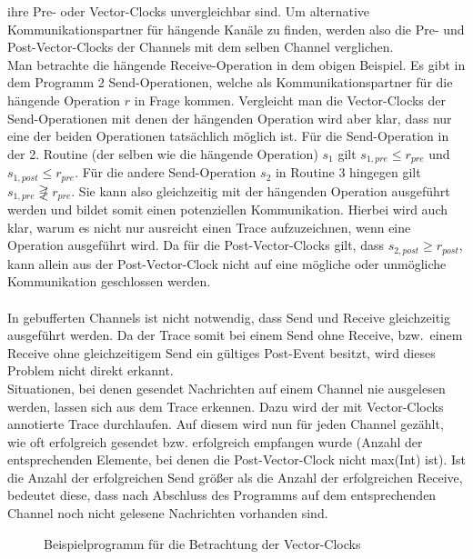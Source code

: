  ihre Pre- oder Vector-Clocks unvergleichbar sind.
Um alternative Kommunikationspartner für hängende Kanäle zu finden, werden also
die Pre- und Post-Vector-Clocks der Channels mit dem selben Channel verglichen.\\
Man betrachte die hängende Receive-Operation in dem obigen Beispiel. Es gibt 
in dem Programm 2 Send-Operationen, welche als Kommunikationspartner für 
die hängende Operation $r$ in Frage kommen. Vergleicht man die Vector-Clocks der 
Send-Operationen mit denen der hängenden Operation wird aber klar, dass nur 
eine der beiden Operationen tatsächlich möglich ist. Für die Send-Operation 
in der 2. Routine (der selben wie die hängende Operation) $s_1$ gilt 
$s_{1, pre} \leq r_{pre}$ und $s_{1, post} \leq r_{pre}$.  
Für die andere Send-Operation $s_2$ in Routine 3 hingegen gilt 
$s_{1, pre} \not\gtreqless r_{pre}$. Sie kann also gleichzeitig mit der 
hängenden Operation ausgeführt werden und bildet somit einen potenziellen 
Kommunikation. Hierbei wird auch klar, warum es nicht nur ausreicht einen 
Trace aufzuzeichnen, wenn eine Operation ausgeführt wird. Da für die 
Post-Vector-Clocks gilt, dass $s_{2, post} \geq r_{post}$, kann allein aus der 
Post-Vector-Clock nicht auf eine mögliche oder unmögliche Kommunikation geschlossen werden.\\\\
In gebufferten Channels ist nicht notwendig, dass Send und Receive gleichzeitig
ausgeführt werden.
Da der Trace somit bei einem Send ohne Receive, bzw.~einem Receive ohne gleichzeitigem
Send ein gültiges Post-Event besitzt, 
wird dieses Problem nicht direkt erkannt.\\
Situationen, bei denen gesendet Nachrichten auf einem Channel 
nie ausgelesen werden, lassen sich aus dem Trace erkennen.
Dazu wird der mit Vector-Clocks annotierte Trace durchlaufen. Auf diesem 
wird nun für jeden Channel gezählt, wie oft erfolgreich gesendet bzw. erfolgreich empfangen 
wurde (Anzahl der entsprechenden Elemente, bei denen die Post-Vector-Clock 
nicht max(Int) ist). Ist die Anzahl der erfolgreichen Send größer als 
die Anzahl der erfolgreichen Receive, bedeutet diese, dass nach Abschluss des 
Programms auf dem entsprechenden Channel noch nicht gelesene Nachrichten vorhanden sind.\\
\begin{figure}[h!]
  \centering
  
  \caption{Beispielprogramm für die Betrachtung der Vector-Clocks}
  \label{Chap:Analyze-Sec:Channel-SubSec:Dangling-Fig:BufferedNoSync}
\end{figure}
